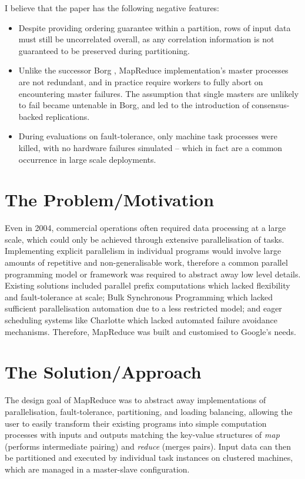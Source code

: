 \documentclass[11pt]{article}
\begin{document}
I believe that the paper has the following negative features:
\begin{itemize}
	\item Despite providing ordering guarantee within a partition, rows of input data must still be uncorrelated overall, as any correlation information is not guaranteed to be preserved during partitioning.
	\item Unlike the successor Borg \cite{verma2015large}, MapReduce implementation's master processes are not redundant, and in practice require workers to fully abort on encountering master failures. The assumption that single masters are unlikely to fail became untenable in Borg, and led to the introduction of consensus-backed replications.
	\item During evaluations on fault-tolerance, only machine task processes were killed, with no hardware failures simulated -- which in fact are a common occurrence in large scale deployments.
\end{itemize}

\section*{The Problem/Motivation}

Even in 2004, commercial operations often required data processing at a large scale, which could only be achieved through extensive parallelisation of tasks. Implementing explicit parallelism in individual programs would involve large amounts of repetitive and non-generalisable work, therefore a common parallel programming model or framework was required to abstract away low level details. Existing solutions included parallel prefix computations \cite{gorlatch1996systematic} which lacked flexibility and fault-tolerance at scale; Bulk Synchronous Programming \cite{valiant1990bridging} which lacked sufficient parallelisation automation due to a less restricted model; and eager scheduling systems like Charlotte \cite{baratloo1999charlotte} which lacked automated failure avoidance mechanisms. Therefore, MapReduce was built and customised to Google's needs.

\section*{The Solution/Approach}

The design goal of MapReduce was to abstract away implementations of parallelisation, fault-tolerance, partitioning, and loading balancing, allowing the user to easily transform their existing programs into simple computation processes with inputs and outputs matching the key-value structures of \emph{map} (performs intermediate pairing) and \emph{reduce} (merges pairs). Input data can then be partitioned and executed by individual task instances on clustered machines, which are managed in a master-slave configuration. 
\end{document}
